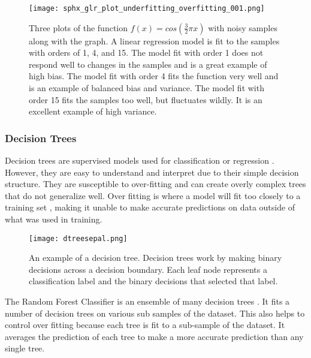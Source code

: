 \begin{figure}[htp]
    \centering
    \texttt{[image: sphx\_glr\_plot\_underfitting\_overfitting\_001.png]}
    \caption{Three plots of the function \( f(x) = cos(\frac{3}{2} \pi x) \) with noisy samples along with the graph. 
    A linear regression model is fit to the samples with orders of 1, 4, and 15.
    The model fit with order 1 does not respond well to changes in the samples and is a great example of high bias.
    The model fit with order 4 fits the function very well and is an example of balanced bias and variance.
    The model fit with order 15 fits the samples too well, but fluctuates wildly. 
    It is an excellent example of high variance.}
    \label{}
\end{figure}

\subsubsection{Decision Trees}
Decision trees are supervised models used for classification or regression \cite{breiman2017classification}.
However, they are easy to understand and interpret due to their simple decision structure. 
They are susceptible to over-fitting and can create overly complex trees that do not generalize well.
Over fitting is where a model will fit too closely to a training set \cite{cawley2010over}, making it unable to make accurate predictions on data outside of what was used in training.

\begin{figure}[htp]
    \centering
    \texttt{[image: dtreesepal.png]}
    \caption{An example of a decision tree.
    Decision trees work by making binary decisions across a decision boundary.
    Each leaf node represents a classification label and the binary decisions that selected that label.}
    \label{}
\end{figure}

\par
The Random Forest Classifier is an ensemble of many decision trees \cite{breiman2001random}.
It fits a number of decision trees on various sub samples of the dataset.
This also helps to control over fitting because each tree is fit to a sub-sample of the dataset.
It averages the prediction of each tree to make a more accurate prediction than any single tree.


